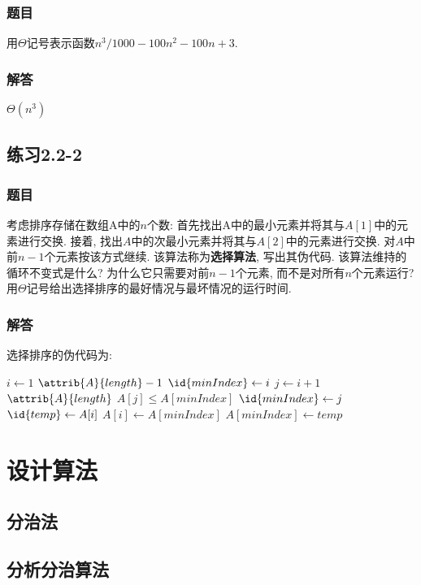 \documentclass[UTF8,a4paper,zihao=-4,oneside,onecolumn,scheme=chinese,autoindent=true]{ctexbook}
\begin{document}
\subsubsection*{题目}
用$\Theta$记号表示函数$n^3/1000-100n^2-100n+3$.
\subsubsection*{解答}
$\Theta(n^3)$

\subsection*{练习2.2-2}
\subsubsection*{题目}
考虑排序存储在数组A中的$n$个数: 首先找出A中的最小元素并将其与$A[1]$中的元素进行交换. 接着, 找出$A$中的次最小元素并将其与$A[2]$中的元素进行交换. 对$A$中前$n-1$个元素按该方式继续. 该算法称为\textbf{选择算法}, 写出其伪代码. 该算法维持的循环不变式是什么? 为什么它只需要对前$n-1$个元素, 而不是对所有$n$个元素运行? 用$\Theta$记号给出选择排序的最好情况与最坏情况的运行时间.
\subsubsection*{解答}
选择排序的伪代码为:
\begin{codebox}
    \li \For $i \gets 1$ \To $\attrib{A}{length} - 1$ \Do
    \li     $\id{minIndex} \gets i$
    \li     \For $j \gets i + 1$ \To $\attrib{A}{length}$ \Do
    \li         \If $A[j] \le A[minIndex]$ \Then
    \li             $\id{minIndex} \gets j$
    \End
    \End
    \li     $\id{temp} \gets A[i]$
    \li     $A[i] \gets A[minIndex]$
    \li     $A[minIndex] \gets temp$
    \End
\end{codebox}

\section{设计算法}
\subsection{分治法}

\subsection{分析分治算法}

\end{document}

